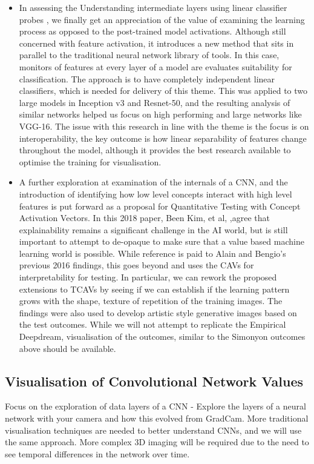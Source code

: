 \begin{itemize}

    \item In assessing the Understanding intermediate layers using linear classifier probes \cite{alain_understanding_2018} , we finally get an appreciation of the value of examining the learning process as opposed to the post-trained model activations. Although still concerned with feature activation, it introduces a new method that sits in parallel to the traditional neural network library of tools. In this case, monitors of features at every layer of a model are evaluates suitability for classification. The approach is to have completely independent linear classifiers, which is needed for delivery of this theme. This was applied to two large models in Inception v3 and Resnet-50, and the resulting analysis of similar networks helped us focus on high performing and large networks like VGG-16. The issue with this research in line with the theme is the focus is on interoperability, the key outcome is how linear separability of features change throughout the model, although it provides the best research available to optimise the training for visualisation.
    
    \item A further exploration at examination of the internals of a CNN, and the introduction of identifying how low level concepts interact with high level features is put forward as a proposal for Quantitative Testing with Concept Activation Vectors. In this 2018 paper, Been Kim, et al, ,agree that explainability remains a significant challenge in the AI world, but is still important to attempt to de-opaque to make sure that a value based machine learning world is possible. While reference is paid to Alain and Bengio’s previous 2016 findings, this goes beyond and uses the CAVs for interpretability for testing. In particular, we can rework the proposed extensions to TCAVs by seeing if we can establish if the learning pattern grows with the shape, texture of repetition of the training images.  The findings were also used to develop artistic style generative images based on the test outcomes. While we will not attempt to replicate the Empirical Deepdream, visualisation of the outcomes, similar to the Simonyon outcomes above should be available.
\end{itemize}

\subsection{Visualisation of Convolutional Network Values}
Focus on the exploration of data layers of a CNN - Explore the layers of a neural network with your camera and how this evolved from GradCam. More traditional visualisation techniques are needed to better understand CNNs, and we will use the same approach. More complex 3D imaging will be required due to the need to see temporal differences in the network over time.


